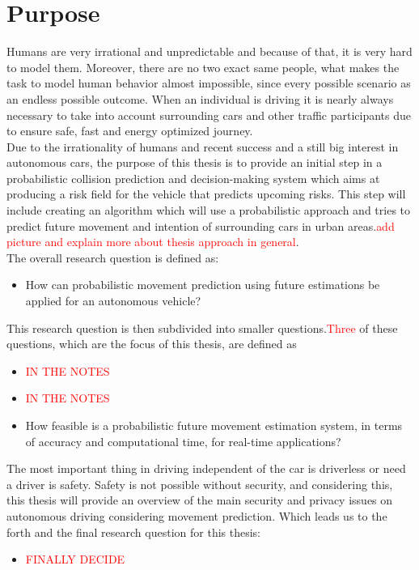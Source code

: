 \section{Purpose}

Humans are very irrational and unpredictable and because of that, it is very hard to model them. Moreover, there are no two exact same people, what makes the task to model human behavior almost impossible, since every possible scenario as an endless possible outcome. When an individual is driving it is nearly always necessary to take into account surrounding cars and other traffic participants due to ensure safe, fast and energy optimized journey. \\

Due to the irrationality of humans and recent success and a still big interest in autonomous cars, the purpose of this thesis is to provide an initial step in a probabilistic collision prediction and decision-making system which aims at producing a risk field for the vehicle that predicts
upcoming risks. This step will include creating an algorithm which will use a probabilistic approach and tries to predict future movement and intention of surrounding cars in urban areas.\textcolor{red}{add picture and explain more about thesis approach in general}.\\

The overall research question is defined
as:
\begin{itemize}
	\item How can probabilistic movement prediction using future estimations be applied for an autonomous vehicle?
\end{itemize}

This research question is then subdivided into smaller questions.\textcolor{red}{Three} of these
questions, which are the focus of this thesis, are defined as
\begin{itemize}
	\item \textcolor{red}{IN THE NOTES} 
	\item \textcolor{red}{IN THE NOTES} 
	\item How feasible is a probabilistic future movement estimation system, in terms of accuracy and computational time, for real-time applications?
\end{itemize}

The most important thing in driving independent of the car is driverless or need a driver is safety. Safety is not possible without security, and considering this, this thesis will provide an overview of the main security and privacy issues on autonomous driving considering movement prediction. Which leads us to the forth and the final research question for this thesis:
\begin{itemize}
	\item \textcolor{red}{FINALLY DECIDE} 
\end{itemize}


